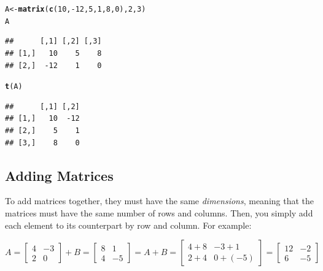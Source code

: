\documentclass[11pt,openany]{book}\usepackage[]{graphicx}\usepackage[]{color}
\makeatletter
\newcommand{\hlnum}[1]{\textcolor[rgb]{0.686,0.059,0.569}{#1}}%
\newcommand{\hlopt}[1]{\textcolor[rgb]{0,0,0}{#1}}%
\newcommand{\hlstd}[1]{\textcolor[rgb]{0.345,0.345,0.345}{#1}}%
\newcommand{\hlkwb}[1]{\textcolor[rgb]{0.69,0.353,0.396}{#1}}%
\newcommand{\hlkwd}[1]{\textcolor[rgb]{0.737,0.353,0.396}{\textbf{#1}}}%
\newenvironment{kframe}{%
 \def\at@end@of@kframe{}%
 \ifinner\ifhmode%
  \def\at@end@of@kframe{\end{minipage}}%
  \begin{minipage}{\columnwidth}%
 \fi\fi%
 \def\FrameCommand##1{\hskip\@totalleftmargin \hskip-\fboxsep
 \colorbox{shadecolor}{##1}\hskip-\fboxsep
     \hskip-\linewidth \hskip-\@totalleftmargin \hskip\columnwidth}%
 \MakeFramed {\advance\hsize-\width
   \@totalleftmargin\z@ \linewidth\hsize
   \@setminipage}}%
 {\par\unskip\endMakeFramed%
 \at@end@of@kframe}
\newenvironment{knitrout}{}{} %
\renewenvironment{knitrout}{\begin{singlespace}}{\end{singlespace}} %
\makeatother
\begin{document}
\begin{knitrout}
\color{fgcolor}\begin{kframe}
\begin{alltt}
\hlstd{A} \hlkwb{<-} \hlkwd{matrix}\hlstd{(}\hlkwd{c}\hlstd{(}\hlnum{10}\hlstd{,} \hlopt{-}\hlnum{12}\hlstd{,} \hlnum{5}\hlstd{,} \hlnum{1}\hlstd{,} \hlnum{8}\hlstd{,} \hlnum{0}\hlstd{),} \hlnum{2}\hlstd{,} \hlnum{3}\hlstd{)}
\hlstd{A}
\end{alltt}
\begin{verbatim}
##      [,1] [,2] [,3]
## [1,]   10    5    8
## [2,]  -12    1    0
\end{verbatim}
\begin{alltt}
\hlkwd{t}\hlstd{(A)}
\end{alltt}
\begin{verbatim}
##      [,1] [,2]
## [1,]   10  -12
## [2,]    5    1
## [3,]    8    0
\end{verbatim}
\end{kframe}
\end{knitrout}


\subsection{Adding Matrices}

To add matrices together, they must have the same \textit{dimensions}, meaning that the matrices must have the same number of rows and columns. Then, you simply add each element to its counterpart by row and column. For example:  

$A =
\begin{bmatrix}
4 & -3 \\
2 & 0 
\end{bmatrix}
+
B =
\begin{bmatrix}
8 & 1 \\
4 & -5
\end{bmatrix}
=
A+B = 
\begin{bmatrix}
4+8 & -3+1 \\
2+4 & 0+(-5)
\end{bmatrix}
=
\begin{bmatrix}
  12 & -2 \\
  6 & -5
\end{bmatrix}$
\end{document}
